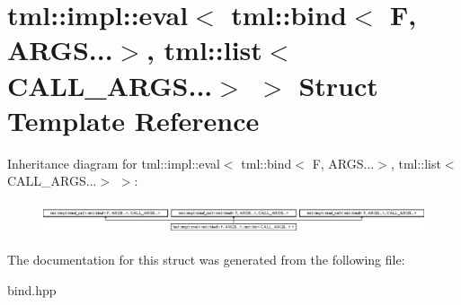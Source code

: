 \hypertarget{structtml_1_1impl_1_1eval_3_01tml_1_1bind_3_01F_00_01ARGS_8_8_8_4_00_01tml_1_1list_3_01CALL__ARGS_8_8_8_4_01_4}{\section{tml\+:\+:impl\+:\+:eval$<$ tml\+:\+:bind$<$ F, A\+R\+G\+S...$>$, tml\+:\+:list$<$ C\+A\+L\+L\+\_\+\+A\+R\+G\+S...$>$ $>$ Struct Template Reference}
\label{structtml_1_1impl_1_1eval_3_01tml_1_1bind_3_01F_00_01ARGS_8_8_8_4_00_01tml_1_1list_3_01CALL__ARGS_8_8_8_4_01_4}
}
Inheritance diagram for tml\+:\+:impl\+:\+:eval$<$ tml\+:\+:bind$<$ F, A\+R\+G\+S...$>$, tml\+:\+:list$<$ C\+A\+L\+L\+\_\+\+A\+R\+G\+S...$>$ $>$\+:\begin{figure}[H]
\begin{center}
\leavevmode
\includegraphics[height=0.949958cm]{structtml_1_1impl_1_1eval_3_01tml_1_1bind_3_01F_00_01ARGS_8_8_8_4_00_01tml_1_1list_3_01CALL__ARGS_8_8_8_4_01_4}
\end{center}
\end{figure}


The documentation for this struct was generated from the following file\+:\begin{DoxyCompactItemize}
\item 
bind.\+hpp\end{DoxyCompactItemize}
